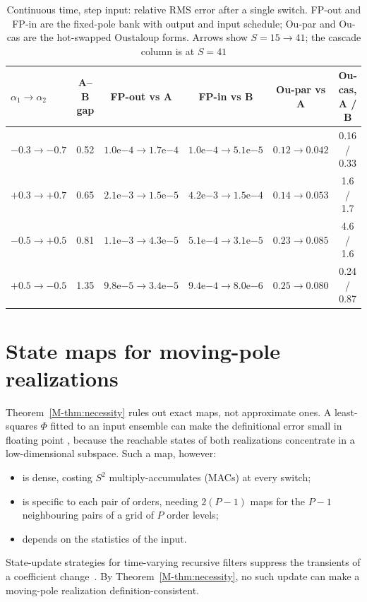 \begin{table}[t]
\caption{Continuous time, step input: relative RMS error after a single switch. FP-out and FP-in are the fixed-pole bank with output and input schedule; Ou-par and Ou-cas are the hot-swapped Oustaloup forms. Arrows show $S=15\to41$; the cascade column is at $S=41$}\label{tab:e1}
\footnotesize\setlength{\tabcolsep}{4pt}
\begin{tabular}{@{}lccccc@{}}
\toprule
$\alpha_1\to\alpha_2$ & A--B gap & FP-out vs A & FP-in vs B & Ou-par vs A & Ou-cas, A / B\\
\midrule
$-0.3\to-0.7$ & 0.52 & $1.0\mathrm{e}{-4}\to1.7\mathrm{e}{-4}$ & $1.0\mathrm{e}{-4}\to5.1\mathrm{e}{-5}$ & $0.12\to0.042$ & 0.16 / 0.33\\
$+0.3\to+0.7$ & 0.65 & $2.1\mathrm{e}{-3}\to1.5\mathrm{e}{-5}$ & $4.2\mathrm{e}{-3}\to1.5\mathrm{e}{-4}$ & $0.14\to0.053$ & 1.6 / 1.7\\
$-0.5\to+0.5$ & 0.81 & $1.1\mathrm{e}{-3}\to4.3\mathrm{e}{-5}$ & $5.1\mathrm{e}{-4}\to3.1\mathrm{e}{-5}$ & $0.23\to0.085$ & 4.6 / 1.6\\
$+0.5\to-0.5$ & 1.35 & $9.8\mathrm{e}{-5}\to3.4\mathrm{e}{-5}$ & $9.4\mathrm{e}{-4}\to8.0\mathrm{e}{-6}$ & $0.25\to0.080$ & 0.24 / 0.87\\
\bottomrule
\end{tabular}
\par{}
\end{table}



\section{State maps for moving-pole realizations}\label{sup:maps}
Theorem~\ref{M-thm:necessity} rules out exact maps, not approximate ones. A least-squares $\Phi$ fitted to an input ensemble can make the definitional error small in floating point , because the reachable states of both realizations concentrate in a low-dimensional subspace. Such a map, however:
\begin{itemize}
\item is dense, costing $S^2$ multiply-accumulates (MACs) at every switch;
\item is specific to each pair of orders, needing $2(P-1)$ maps for the $P-1$ neighbouring pairs of a grid of $P$ order levels;
\item depends on the statistics of the input.
\end{itemize}
State-update strategies for time-varying recursive filters suppress the transients of a coefficient change~\cite{zetterberg1988,valimaki1998}. By Theorem~\ref{M-thm:necessity}, no such update can make a moving-pole realization definition-consistent.




